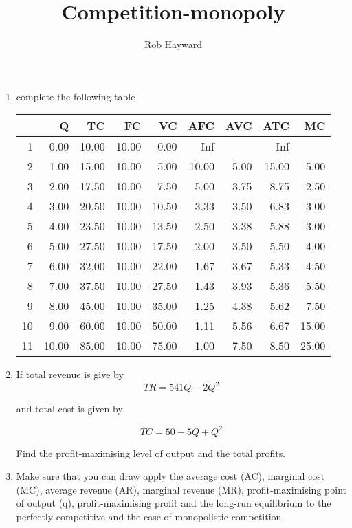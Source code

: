 \documentclass[12pt, a4paper, oneside]{article}\usepackage[]{graphicx}\usepackage[]{color}
\author{Rob Hayward}
\begin{document}
\title{Competition-monopoly}
\maketitle

\begin{enumerate}
\item complete the following table

\begin{table}[ht]
\centering
\begin{tabular}{rrrrrrrrr}
  \hline
 & Q & TC & FC & VC & AFC & AVC & ATC & MC \\ 
  \hline
1 & 0.00 & 10.00 & 10.00 & 0.00 & Inf &  & Inf &  \\ 
  2 & 1.00 & 15.00 & 10.00 & 5.00 & 10.00 & 5.00 & 15.00 & 5.00 \\ 
  3 & 2.00 & 17.50 & 10.00 & 7.50 & 5.00 & 3.75 & 8.75 & 2.50 \\ 
  4 & 3.00 & 20.50 & 10.00 & 10.50 & 3.33 & 3.50 & 6.83 & 3.00 \\ 
  5 & 4.00 & 23.50 & 10.00 & 13.50 & 2.50 & 3.38 & 5.88 & 3.00 \\ 
  6 & 5.00 & 27.50 & 10.00 & 17.50 & 2.00 & 3.50 & 5.50 & 4.00 \\ 
  7 & 6.00 & 32.00 & 10.00 & 22.00 & 1.67 & 3.67 & 5.33 & 4.50 \\ 
  8 & 7.00 & 37.50 & 10.00 & 27.50 & 1.43 & 3.93 & 5.36 & 5.50 \\ 
  9 & 8.00 & 45.00 & 10.00 & 35.00 & 1.25 & 4.38 & 5.62 & 7.50 \\ 
  10 & 9.00 & 60.00 & 10.00 & 50.00 & 1.11 & 5.56 & 6.67 & 15.00 \\ 
  11 & 10.00 & 85.00 & 10.00 & 75.00 & 1.00 & 7.50 & 8.50 & 25.00 \\ 
   \hline
\end{tabular}
\end{table}




\item If total revenue is give by 
\begin{equation*}
TR = 541Q - 2Q^2
\end{equation*}

and total cost is given by 

\begin{equation*}
TC = 50 - 5Q + Q^2
\end{equation*}

Find the profit-maximising level of output and the total profits. 

\item Make sure that you can draw apply the average cost (AC), marginal cost (MC), average revenue (AR), marginal revenue (MR), profit-maximising point of output (q), profit-maximising profit and the long-run equilibrium to the  perfectly competitive and the case of monopolistic competition. 

\end{enumerate}
\end{document}

